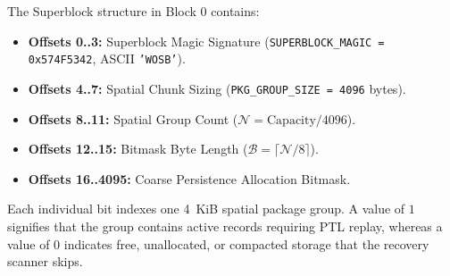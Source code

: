 \documentclass[conference]{IEEEtran}
\begin{document}
The Superblock structure in Block 0 contains:
\begin{itemize}
    \item \textbf{Offsets 0..3:} Superblock Magic Signature (\texttt{SUPERBLOCK\_MAGIC = 0x574F5342}, ASCII \texttt{'WOSB'}).
    \item \textbf{Offsets 4..7:} Spatial Chunk Sizing (\texttt{PKG\_GROUP\_SIZE = 4096} bytes).
    \item \textbf{Offsets 8..11:} Spatial Group Count ($\mathcal{N} = \text{Capacity} / 4096$).
    \item \textbf{Offsets 12..15:} Bitmask Byte Length ($\mathcal{B} = \lceil \mathcal{N} / 8 \rceil$).
    \item \textbf{Offsets 16..4095:} Coarse Persistence Allocation Bitmask.
\end{itemize}
Each individual bit indexes one 4~KiB spatial package group. A value of $1$ signifies that the group contains active records requiring PTL replay, whereas a value of $0$ indicates free, unallocated, or compacted storage that the recovery scanner skips.
\end{document}
